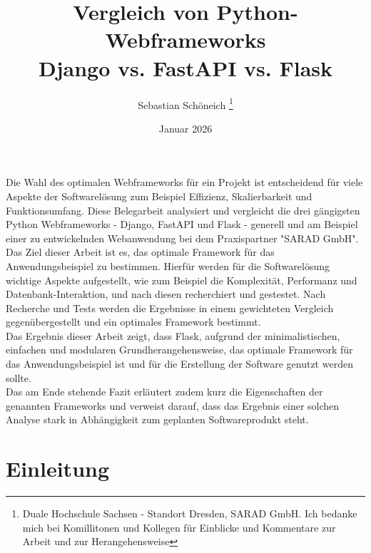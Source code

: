 \documentclass[letterpaper,11pt,leqno]{article}
\begin{document}
\title{Vergleich von Python-Webframeworks\\Django vs. FastAPI vs. Flask}
\author{Sebastian Schöneich
\thanks{Duale Hochschule Sachsen - Standort Dresden, SARAD GmbH. Ich bedanke mich bei Komillitonen und Kollegen für Einblicke und
Kommentare zur Arbeit und zur Herangehensweise}}
\date{Januar 2026}   
\begin{titlepage}
\maketitle
Die Wahl des optimalen Webframeworks für ein Projekt ist entscheidend für viele Aspekte der
Softwarelösung zum Beispiel Effizienz, Skalierbarkeit und Funktionsumfang. Diese Belegarbeit
analysiert und vergleicht die drei gängigsten Python Webframeworks - Django, FastAPI und Flask -
generell und am Beispiel einer zu entwickelnden Webanwendung bei dem Praxispartner "SARAD GmbH".\\
Das Ziel dieser Arbeit ist es, das optimale Framework für das Anwendungsbeispiel zu bestimmen.
Hierfür werden für die Softwarelösung wichtige Aspekte aufgestellt, wie zum Beispiel die
Komplexität, Performanz und Datenbank-Interaktion, und nach diesen recherchiert und gestestet. Nach
Recherche und Tests werden die Ergebnisse in einem gewichteten Vergleich gegenübergestellt und ein
optimales Framework bestimmt.\\Das Ergebnis dieser Arbeit zeigt, dass Flask, aufgrund der
minimalistischen, einfachen und modularen Grundherangehensweise, das optimale Framework für das
Anwendungsbeispiel ist und für die Erstellung der Software genutzt werden sollte.\\ Das am Ende
stehende Fazit erläutert zudem kurz die Eigenschaften der genannten Frameworks und verweist darauf,
dass das Ergebnis einer solchen Analyse stark in Abhängigkeit zum geplanten Softwareprodukt steht.

\clearpage
\tableofcontents
\clearpage
\listoffigures
\listoftables
\end{titlepage}

\section{Einleitung}\label{s:einleitung}
\end{document}
